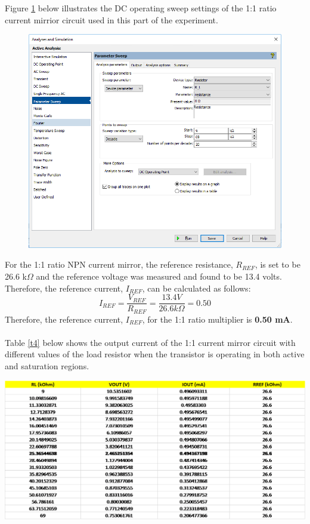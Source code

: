 \documentclass{article}
\begin{document}
	\noindent Figure \ref{f11} below illustrates the DC operating sweep settings of the 1:1 ratio current mirrior circuit used in this part of the experiment.
	\begin{figure}[!ht]
		\centering
		\includegraphics[width=0.6\linewidth]{d1-part3-DcOperatingSweep.png}
		\label{f11}
	\end{figure}
		
	\pagebreak
	
	\noindent For the 1:1 ratio NPN current mirror, the reference resistance, $R_{REF}$, is set to be 26.6 k$\Omega$ and the reference voltage was measured and found to be 13.4 volts.
	Therefore, the reference current, $I_{REF}$, can be calculated as follows: $$I_{REF} = \frac{V_{REF}}{R_{REF}} = \frac{13.4 V}{26.6 k\Omega} = 0.50$$
	Therefore, the reference current, $I_{REF}$, for the 1:1 ratio multiplier is \textbf{0.50 mA}.\\\\	
	Table \ref{t4} below shows the output current of the 1:1 current mirror circuit with different values of the load resistor when the transistor is operating in both active and saturation regions.
	\begin{table}[!ht]
		\centering
		\label{t4}
		\includegraphics[width=\linewidth]{part3-data-measured-npn-1_1.png}	
	\end{table}
	
\end{document}
